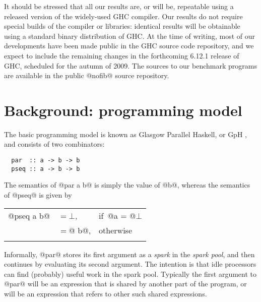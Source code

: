 \documentclass[twocolumn,9pt]{sigplanconf}
\begin{document}
It should be stressed that all our results are, or will be, repeatable
using a released version of the widely-used GHC compiler.  Our results
do not require special builds of the compiler or libraries: identical
results will be obtainable using a standard binary distribution of
GHC.  At the time of writing, most of our developments have been made
public in the GHC source code repository, and we expect to include the
remaining changes in the forthcoming 6.12.1 release of GHC, scheduled
for the autumn of 2009.  The sources to our benchmark programs are
available in the public @nofib@ source repository.

% 
% 
% 
%

\section{Background: programming model}
\label{s:prog-model}

The basic programming model is known as Glasgow Parallel Haskell, or
GpH \cite{trinder:strategies}, and consists of two combinators:

\begin{verbatim}
  par  :: a -> b -> b
  pseq :: a -> b -> b
\end{verbatim}
The semantics of @par a b@ is simply the value of @b@, whereas the
semantics of @pseq@ is given by 

\begin{tabular}{lll}
\\
@pseq a b@&$= \bot$, &\mbox{if}~@a = @$\bot$ \\
          &$= $@ b@, &\mbox{otherwise} \\
\\
\end{tabular}

\noindent
Informally, @par@ stores its first argument as a \emph{spark} in the \emph{spark pool}, 
and then continues by evaluating its second argument.  The intention is that
idle processors can find (probably) useful work in the spark pool.
Typically the first
argument to @par@ will be an expression that is shared by another part
of the program, or will be an expression that refers to other such
shared expressions.
\end{document}

